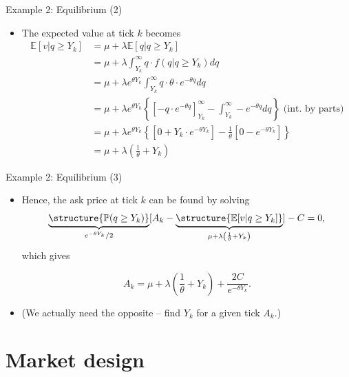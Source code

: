 \documentclass[english,10pt]{beamer}
\begin{document}
\begin{frame}{Example 2: Equilibrium (2)}
	\begin{itemize}
		\item The expected value at tick $k$ becomes
		\begin{align*}
		\mathbb{E}[v|q \geq Y_{k}] & =  \mu + \lambda \mathbb{E}[q|q \geq Y_{k}]\\
		&=\mu+ \lambda \int^\infty_{Y_k} q \cdot f(q|q \geq Y_{k}) dq\\
		&=\mu+ \lambda e^{\theta Y_{k}} \int^\infty_{Y_k} q \cdot \theta \cdot e^{-\theta q} dq\\
		& =  \mu+ \lambda e^{\theta Y_{k}} \left\{\left[- q \cdot e^{-\theta q} \right]^\infty_{Y_k} -\int^\infty_{Y_k} -e^{-\theta q} dq   \right\}\text{ (int. by parts)} \\
		& =  \mu+ \lambda e^{\theta Y_{k}} \left\{\left[0+ Y_k \cdot  e^{-\theta Y_k} \right] -\frac{1}{\theta}[0-e^{-\theta Y_k}]   \right\} \\
		& = \mu + \lambda \left( \frac{1}{\theta }+ Y_{k} \right)
		\end{align*}
	\end{itemize}
\end{frame}


\begin{frame}{Example 2: Equilibrium (3)}
	\begin{itemize}
		\item Hence, the ask price at tick $k$ can be found by solving
		\[
		\underbrace{\structure{\mathbb{P}(q \geq Y_k)}}_{e^{-\theta Y_{k}}/2}[A_k-\underbrace{\structure{\mathbb{E}[v|q \geq Y_k]}}_{\mu + \lambda \left( \frac{1}{\theta }+ Y_{k} \right)}] - C = 0,
		\]
		which gives
		\begin{block}{}
			\[
			A_k=\mu + \lambda \left( \frac{1}{\theta }+ Y_{k}\right) + \frac{2C}{e^{-\theta Y_{k}}}.
			\]
		\end{block}
		\item (We actually need the opposite -- find $Y_k$ for a given tick $A_k$.)
	\end{itemize}
\end{frame}



\section{Market design}
\end{document}

